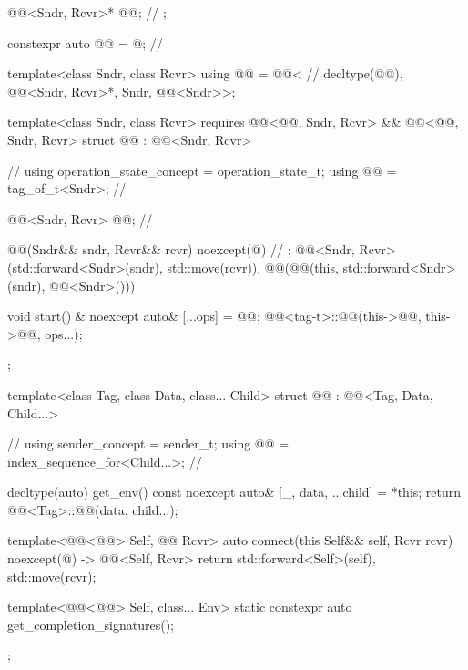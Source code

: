 \begin{codeblock}
{{    @@<Sndr, Rcvr>* @@;                                // \expos
  };

  constexpr auto @@ = @\seebelownc@;                       // \expos

  template<class Sndr, class Rcvr>
  using @@ = @@<                     // \expos
    decltype(@@), @@<Sndr, Rcvr>*, Sndr, @@<Sndr>>;

  template<class Sndr, class Rcvr>
    requires @@<@@, Sndr, Rcvr> &&
             @@<@@, Sndr, Rcvr>
  struct @@ : @@<Sndr, Rcvr> {            // \expos
    using operation_state_concept = operation_state_t;
    using @@ = tag_of_t<Sndr>;                               // \expos

    @@<Sndr, Rcvr> @@;                   // \expos

    @@(Sndr&& sndr, Rcvr&& rcvr) noexcept(@\seebelownc@)               // \expos
      : @@<Sndr, Rcvr>(std::forward<Sndr>(sndr), std::move(rcvr)),
        @@(@@(this, std::forward<Sndr>(sndr), @@<Sndr>()))
    {}

    void start() & noexcept {
      auto& [...ops] = @@;
      @@<tag-t>::@@(this->@@, this->@@, ops...);
    }
  };

  template<class Tag, class Data, class... Child>
  struct @@ : @@<Tag, Data, Child...> {     // \expos
    using sender_concept = sender_t;
    using @@ = index_sequence_for<Child...>;           // \expos

    decltype(auto) get_env() const noexcept {
      auto& [_, data, ...child] = *this;
      return @@<Tag>::@@(data, child...);
    }

    template<@@<@@> Self, @@ Rcvr>
    auto connect(this Self&& self, Rcvr rcvr) noexcept(@\seebelow@)
      -> @@<Self, Rcvr> {
      return {std::forward<Self>(self), std::move(rcvr)};
    }

    template<@@<@@> Self, class... Env>
    static constexpr auto get_completion_signatures();
  };
}
\end{codeblock}

